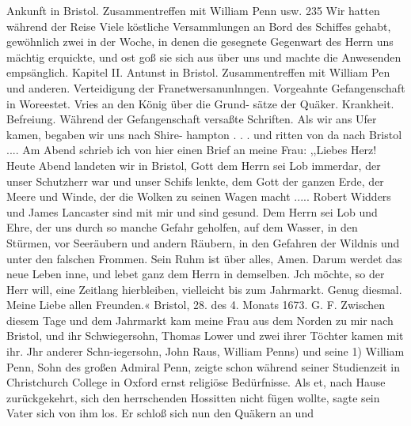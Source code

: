 Ankunft in Bristol. Zusammentreffen mit William Penn usw. 235
Wir hatten während der Reise Viele köstliche Versammlungen
an Bord des Schiffes gehabt, gewöhnlich zwei in der Woche, in
denen die gesegnete Gegenwart des Herrn uns mächtig erquickte,
und ost goß sie sich aus über uns und machte die Anwesenden
empsänglich.
Kapitel II.
Antunst in Bristol. Zusammentreffen mit William Pen und
anderen. Verteidigung der Franetwersanunlnngen. Vorgeahnte
Gefangenschaft in Woreestet. Vries an den König über die Grund-
sätze der Quäker. Krankheit. Befreiung. Während der
Gefangenschaft versaßte Schriften.
Als wir ans Ufer kamen, begaben wir uns nach Shire-
hampton . . . und ritten von da nach Bristol .... Am Abend
schrieb ich von hier einen Brief an meine Frau:
,,Liebes Herz!
Heute Abend landeten wir in Bristol, Gott dem Herrn sei
Lob immerdar, der unser Schutzherr war und unser Schifs lenkte,
dem Gott der ganzen Erde, der Meere und Winde, der die Wolken
zu seinen Wagen macht ..... Robert Widders und James
Lancaster sind mit mir und sind gesund. Dem Herrn sei Lob
und Ehre, der uns durch so manche Gefahr geholfen, auf dem
Wasser, in den Stürmen, vor Seeräubern und andern Räubern,
in den Gefahren der Wildnis und unter den falschen Frommen.
Sein Ruhm ist über alles, Amen. Darum werdet das neue
Leben inne, und lebet ganz dem Herrn in demselben. Jch möchte,
so der Herr will, eine Zeitlang hierbleiben, vielleicht bis zum
Jahrmarkt. Genug diesmal. Meine Liebe allen Freunden.«
Bristol, 28. des 4. Monats 1673. G. F.
Zwischen diesem Tage und dem Jahrmarkt kam meine Frau
aus dem Norden zu mir nach Bristol, und ihr Schwiegersohn,
Thomas Lower und zwei ihrer Töchter kamen mit ihr. Jhr
anderer Schn-iegersohn, John Raus, William Penns) und seine
1) William Penn, Sohn des großen Admiral Penn, zeigte schon während
seiner Studienzeit in Christchurch College in Oxford ernst religiöse Bedürfnisse.
Als et, nach Hause zurückgekehrt, sich den herrschenden Hossitten nicht fügen wollte,
sagte sein Vater sich von ihm los. Er schloß sich nun den Quäkern an und


